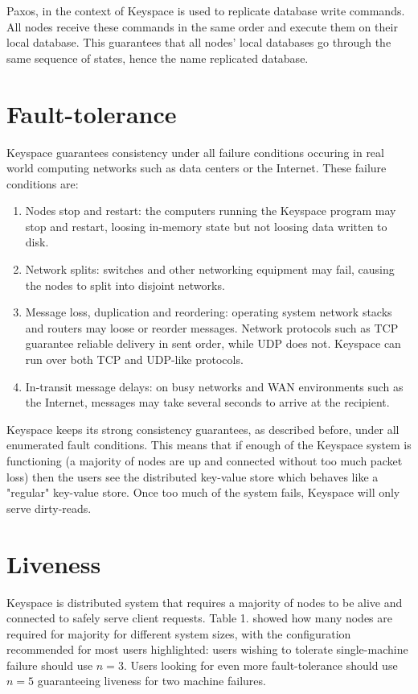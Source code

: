 \documentclass[12pt]{article}
\begin{document}
Paxos, in the context of Keyspace is used to replicate database write commands. All nodes receive these commands in the same order and execute them on their local database. This guarantees that all nodes' local databases go through the same sequence of states, hence the name replicated database.

\section{ Fault-tolerance }

Keyspace guarantees consistency under all failure conditions occuring in real world computing networks such as data centers or the Internet. These failure conditions are:

\begin{enumerate}
\item Nodes stop and restart: the computers running the Keyspace program may stop and restart, loosing in-memory state but not loosing data written to disk.
\item Network splits: switches and other networking equipment may fail, causing the nodes to split into disjoint networks.
\item Message loss, duplication and reordering: operating system network stacks and routers may loose or reorder messages. Network protocols such as TCP guarantee reliable delivery in sent order, while UDP does not. Keyspace can run over both TCP and UDP-like protocols.
\item In-transit message delays: on busy networks and WAN environments such as the Internet, messages may take several seconds to arrive at the recipient.
\end{enumerate}

Keyspace keeps its strong consistency guarantees, as described before, under all enumerated fault conditions. This means that if enough of the Keyspace system is functioning (a majority of nodes are up and connected without too much packet loss) then the users see the distributed key-value store which behaves like a "regular" key-value store. Once too much of the system fails, Keyspace will only serve dirty-reads.

\section{ Liveness }

Keyspace is distributed system that requires a majority of nodes to be alive and connected to safely serve client requests. Table 1. showed how many nodes are required for majority for different system sizes, with the configuration recommended for most users highlighted: users wishing to tolerate single-machine failure should use $n=3$. Users looking for even more fault-tolerance should use $n=5$ guaranteeing liveness for two machine failures.
\end{document}
